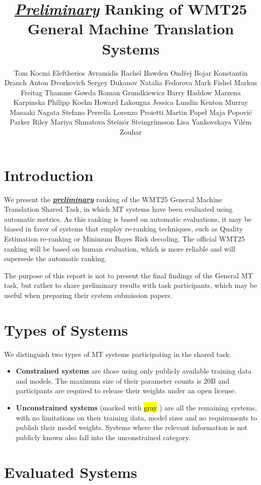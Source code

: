 \documentclass[11pt]{article}
\title{\underline{\textit{Preliminary}} Ranking of WMT25 General Machine Translation Systems}
\author{
  \null \AND
  Tom Kocmi  
  \And
  Eleftherios Avramidis 
  \And
  Rachel Bawden 
  \And
  Ond\v{r}ej Bojar
  \And
  Konstantin Dranch
  \AND
  Anton Dvorkovich 
  \And
  Sergey Dukanov 
  \And
  Natalia Fedorova 
  \And
  Mark Fishel  
  \And
  Markus Freitag
  \AND
  Thamme Gowda
  \And
  Roman Grundkiewicz
  \And
  Barry Haddow  
  \And
  Marzena Karpinska 
  \AND
  Philipp Koehn 
  \And
  Howard Lakougna
  \And
  Jessica Lundin
  \And
  Kenton Murray 
  \And
  Masaaki Nagata
  \AND
  Stefano Perrella 
  \And
  Lorenzo Proietti
  \And
  Martin Popel 
  \And 
  Maja Popovi\'{c}  
  \And
  Parker Riley 
  \AND
  Mariya Shmatova 
  \And
  Stein\th\'{o}r Steingr\'{i}msson 
  \And
  Lisa Yankovskaya 
  \And 
  Vilém Zouhar
% 
  \vspace{2cm}
}
\newcommand{\hlc}[2][yellow]{{%
    \colorlet{foo}{#1}%
    \sethlcolor{foo}\hl{#2}}%
}
\begin{document}
\maketitle


\section*{Introduction}

We present the \underline{\textbf{\textit{preliminary}}} ranking of the WMT25 General Machine Translation Shared Task, in which MT systems have been evaluated using automatic metrics. As this ranking is based on automatic evaluations, it may be biased in favor of systems that employ re-ranking techniques, such as Quality Estimation re-ranking or Minimum Bayes Risk decoding. The official WMT25 ranking will be based on human evaluation, which is more reliable and will supersede the automatic ranking.

The purpose of this report is not to present the final findings of the General MT task, but rather to share preliminary results with task participants, which may be useful when preparing their system submission papers.

\section*{Types of Systems}

We distinguish two types of MT systems participating in the shared task:
\begin{itemize}%
\item \textbf{Constrained systems} are those using only publicly available training data and models. The maximum size of their parameter counts is 20B and participants are required to release their weights under an open license. 

\item \textbf{Unconstrained systems} (marked with \hlc[gray!30]{gray}) are all the remaining systems, with no limitations on their training data, model sizes and no requirements to publish their model weights. Systems where the relevant information is not publicly known also fall into the unconstrained category.
\end{itemize}


\section*{Evaluated Systems}
\end{document}
